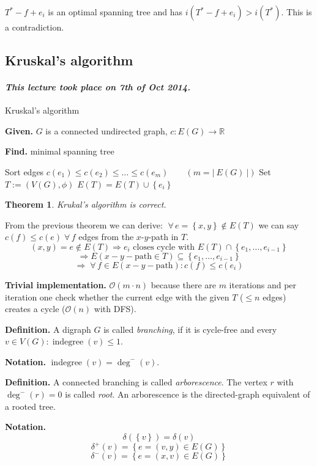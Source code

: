 \documentclass{article}
\newtheorem{theorem}{Theorem}
\newcommand{\card}[1]{\left|\:\!#1\:\!\right|}
\newcommand{\set}[1]{\left\{#1\right\}}
\newcommand{\given}[1]{\textbf{Given.} #1\par}
\newcommand{\find}[1]{\textbf{Find.} #1\par}
\newcommand{\dateref}[1]{\paragraph{\textit{This lecture took place on #1.}}}
\newcommand{\gath}[2]{$#1$-$#2$-path} %
\newcommand{\fall}{\;\forall\,}
\begin{document}
$T^* - f + e_i$ is an optimal spanning tree and has $i(T^* - f + e_i) > i(T^*)$. This is a contradiction.

\subsection{Kruskal's algorithm}
%
\dateref{7th of Oct 2014}

\begin{algorithm}
  \caption{Kruskal's algorithm}
  \label{kruskals-algo}
  \given{$G$ is a connected undirected graph, $c: E(G) \rightarrow \mathbb{R}$}
  \find{minimal spanning tree}
\begin{algorithmic}[1]
  \State Sort edges $c(e_1) \leq c(e_2) \leq \ldots \leq c(e_m) \qquad (m = \card{E(G)})$
  \State Set $T := (V(G), \phi)$
    \If{$T \cup \set{e_i}$ is cycle-free}
      \State $E(T) = E(T) \cup \set{e_i}$
    \EndIf
  \EndFor
\end{algorithmic}
\end{algorithm}

\begin{theorem}\label{satz-2.3}
  Krukal's algorithm is correct.
\end{theorem}

From the previous theorem we can derive: $\fall e = \set{x, y} \notin E(T)$ we can say $c(f) \leq c(e) \fall f$ edges from the \gath xy in $T$.
\[
    (x, y) = e \notin E(T) \Rightarrow e_i \text{ closes cycle with } E(T) \cap \set{e_1, \ldots, e_{i-1}}
\] \[
    \Rightarrow E(x-y-\text{path} \in T) \subseteq \set{e_1, \ldots, e_{i-1}}
\] \[
    \Rightarrow \fall f \in E(x-y-\text{path}): c(f) \leq c(e_i)
\]

\textbf{Trivial implementation.}
  $\mathcal{O}(m\cdot n)$ because there are $m$ iterations and per iteration one check whether the current edge with the given $T$ ($\leq n$ edges) creates a cycle ($\mathcal{O}(n)$ with DFS).

\textbf{Definition.}
  A digraph $G$ is called \emph{branching}, if it is cycle-free and every $v \in V(G): \operatorname{indegree}(v) \leq 1$.

\textbf{Notation.}
  $\operatorname{indegree}(v) = \operatorname{deg}^-(v)$.

\textbf{Definition.}
  A connected branching is called \emph{arborescence}. The vertex $r$ with $\operatorname{deg}^-(r) = 0$ is called \emph{root}.
  An arborescence is the directed-graph equivalent of a rooted tree.

\textbf{Notation.}
  \[
    \delta(\set{v}) = \delta(v)
  \] \[
    \delta^+(v) = \set{e = (v, y) \in E(G)}
  \] \[
    \delta^-(v) = \set{e = (x, v) \in E(G)}
  \]
\end{document}
